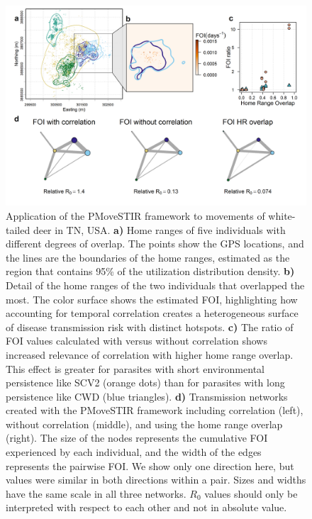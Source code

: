 \documentclass[letterpaper]{article}
\begin{document}
\begin{figure}
     \includegraphics[width=\textwidth]{figures/deer_results.png}
    \caption{Application of the PMoveSTIR framework to movements of white-tailed deer in TN, USA. \textbf{a)} Home ranges of five individuals with different degrees of overlap. The points show the GPS locations, and the lines are the boundaries of the home ranges, estimated as the region that contains 95\% of the utilization distribution density. \textbf{b)} Detail of the home ranges of the two individuals that overlapped the most. The color surface shows the estimated FOI, highlighting how accounting for temporal correlation creates a heterogeneous surface of disease transmission risk with distinct hotspots. \textbf{c)} The ratio of FOI values calculated with versus without correlation shows increased relevance of correlation with higher home range overlap. This effect is greater for parasites with short environmental persistence like SCV2 (orange dots) than for parasites with long persistence like CWD (blue triangles). \textbf{d)} Transmission networks created with the PMoveSTIR framework including correlation (left), without correlation (middle), and using the home range overlap (right). The size of the nodes represents the cumulative FOI experienced by each individual, and the width of the edges represents the pairwise FOI. We show only one direction here, but values were similar in both directions within a pair. Sizes and widths have the same scale in all three networks. $R_0$ values should only be interpreted with respect to each other and not in absolute value.}
	\label{fig:empiricalres}
\end{figure}

\clearpage


\end{document}

